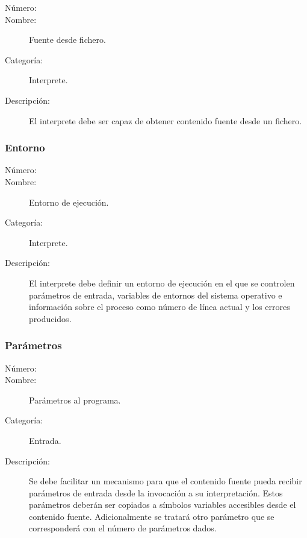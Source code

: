 \begin{framed}
	\begin{description}
		\item [Número:] \cn
		\item [Nombre:] Fuente desde fichero.
		\item [Categoría:] Interprete.
		\item [Descripción:] El interprete debe ser capaz de obtener contenido fuente desde un fichero.
	\end {description}
\end{framed}

\subsubsection{Entorno}
\begin{framed}
	\begin{description}
		\item [Número:] \cn
		\item [Nombre:] Entorno de ejecución.
		\item [Categoría:] Interprete.
		\item [Descripción:] El interprete debe definir un entorno de ejecución en
		el que se controlen parámetros de entrada, variables de entornos del sistema operativo e información sobre
		el proceso como número de línea actual y los errores producidos.
	\end {description}
\end{framed}

\subsubsection {Parámetros}
\begin{framed}
	\begin{description}
		\item [Número:] \cn
		\item [Nombre:] Parámetros al programa.
		\item [Categoría:] Entrada.
		\item [Descripción:] Se debe facilitar un mecanismo para que el contenido fuente pueda recibir parámetros de entrada desde la
		invocación a su interpretación. Estos parámetros deberán ser copiados a símbolos variables accesibles desde el contenido fuente. 
		Adicionalmente se tratará otro parámetro que se corresponderá con el número de parámetros dados.
	\end{description}
\end{framed}
